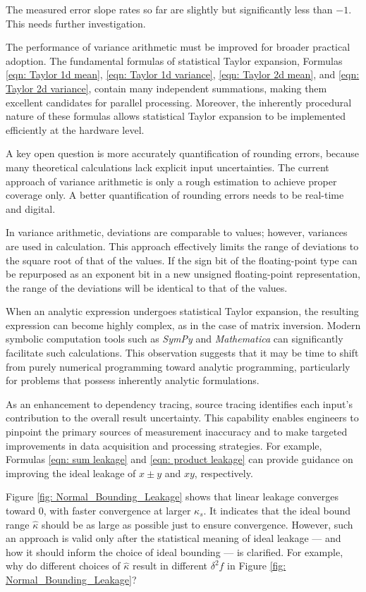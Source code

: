\documentclass[twoside]{article}
\numberwithin{equation}{section}
\begin{document}
The measured error slope rates so far are slightly but significantly less than $-1$.
This needs further investigation.

The performance of variance arithmetic must be improved for broader practical adoption.
The fundamental formulas of statistical Taylor expansion, Formulas \eqref{eqn: Taylor 1d mean}, \eqref{eqn: Taylor 1d variance}, \eqref{eqn: Taylor 2d mean}, and \eqref{eqn: Taylor 2d variance}, contain many independent summations, making them excellent candidates for parallel processing.
Moreover, the inherently procedural nature of these formulas allows statistical Taylor expansion to be implemented efficiently at the hardware level.

A key open question is more accurately quantification of rounding errors, because many theoretical calculations lack explicit input uncertainties. 
The current approach of variance arithmetic is only a rough estimation to achieve proper coverage only. 
A better quantification of rounding errors needs to be real-time and digital. 

In variance arithmetic, deviations are comparable to values; however, variances are used in calculation.
This approach effectively limits the range of deviations to the square root of that of the values.
If the sign bit of the floating-point type can be repurposed as an exponent bit in a new unsigned floating-point representation, the range of the deviations will be identical to that of the values.

When an analytic expression undergoes statistical Taylor expansion, the resulting expression can become highly complex, as in the case of matrix inversion.
Modern symbolic computation tools such as \textit{SymPy} and \textit{Mathematica} can significantly facilitate such calculations.
This observation suggests that it may be time to shift from purely numerical programming toward analytic programming, particularly for problems that possess inherently analytic formulations.

As an enhancement to dependency tracing, source tracing identifies each input's contribution to the overall result uncertainty.
This capability enables engineers to pinpoint the primary sources of measurement inaccuracy and to make targeted improvements in data acquisition and processing strategies.
For example, Formulas \eqref{eqn: sum leakage} and \eqref{eqn: product leakage} can provide guidance on improving the ideal leakage of $x \pm y$ and $xy$, respectively.

Figure \ref{fig: Normal_Bounding_Leakage} shows that linear leakage converges toward $0$, with faster convergence at larger $\kappa_s$.
It indicates that the ideal bound range $\hat{\kappa}$ should be as large as possible just to ensure convergence.
However, such an approach is valid only after the statistical meaning of ideal leakage --- and how it should inform the choice of ideal bounding --- is clarified.
For example, why do different choices of $\hat{\kappa}$ result in different $\delta^2 f$ in Figure \ref{fig: Normal_Bounding_Leakage}?
\end{document}
